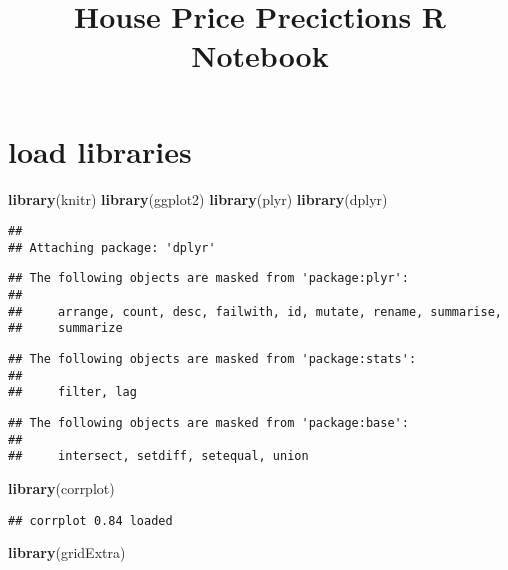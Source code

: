 \documentclass[]{article}
\title{House Price Precictions R Notebook}
\author{}
\date{}
\newenvironment{Shaded}{\begin{snugshade}}{\end{snugshade}}
\newcommand{\KeywordTok}[1]{\textcolor[rgb]{0.13,0.29,0.53}{\textbf{#1}}}
\newcommand{\NormalTok}[1]{#1}
\begin{document}
\maketitle

\section{load libraries}\label{load-libraries}

\begin{Shaded}
\begin{Highlighting}[]
\KeywordTok{library}\NormalTok{(knitr)}
\KeywordTok{library}\NormalTok{(ggplot2)}
\KeywordTok{library}\NormalTok{(plyr)}
\KeywordTok{library}\NormalTok{(dplyr)}
\end{Highlighting}
\end{Shaded}

\begin{verbatim}
## 
## Attaching package: 'dplyr'
\end{verbatim}

\begin{verbatim}
## The following objects are masked from 'package:plyr':
## 
##     arrange, count, desc, failwith, id, mutate, rename, summarise,
##     summarize
\end{verbatim}

\begin{verbatim}
## The following objects are masked from 'package:stats':
## 
##     filter, lag
\end{verbatim}

\begin{verbatim}
## The following objects are masked from 'package:base':
## 
##     intersect, setdiff, setequal, union
\end{verbatim}

\begin{Shaded}
\begin{Highlighting}[]
\KeywordTok{library}\NormalTok{(corrplot)}
\end{Highlighting}
\end{Shaded}

\begin{verbatim}
## corrplot 0.84 loaded
\end{verbatim}

\begin{Shaded}
\begin{Highlighting}[]
\KeywordTok{library}\NormalTok{(gridExtra)}
\end{Highlighting}
\end{Shaded}
\end{document}
